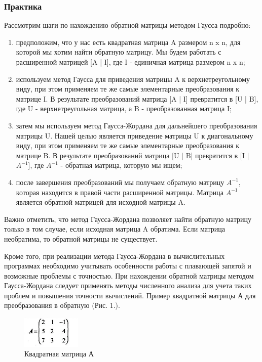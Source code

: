 \documentclass[12pt,a4paper]{scrartcl}
\begin{document}
\subsubsection{Практика}
Рассмотрим шаги по нахождению обратной матрицы методом Гаусса подробно:
\begin{enumerate}
        \item предположим, что у нас есть квадратная матрица A размером n x n, для которой мы хотим найти обратную матрицу. Мы будем работать с расширенной матрицей [A | I], где I - единичная матрица размером n x n;
        \item используем метод Гаусса для приведения матрицы A к верхнетреугольному виду, при этом применяем те же самые элементарные преобразования к матрице I. В результате преобразований матрица [A | I] превратится в [U | B], где U - верхнетреугольная матрица, а B - преобразованная матрица I;
        \item  затем мы используем метод Гаусса-Жордана для дальнейшего преобразования матрицы U. Нашей целью является приведение матрицы U к диагональному виду, при этом применяем те же самые элементарные преобразования к матрице B. В результате преобразований матрица [U | B] превратится в [I | $A^{-1}$], где $A^{-1}$ - обратная матрица, которую мы ищем;
        \item после завершения преобразований мы получаем обратную матрицу $A^{-1}$, которая находится в правой части расширенной матрицы. Матрица $A^{-1}$ является обратной матрицей для исходной матрицы A.
    \end{enumerate}
    \noindent 

Важно отметить, что метод Гаусса-Жордана позволяет найти обратную матрицу только в том случае, если исходная матрица A обратима. Если матрица необратима, то обратной матрицы не существует.

Кроме того, при реализации метода Гаусса-Жордана в вычислительных программах необходимо учитывать особенности работы с плавающей запятой и возможные проблемы с точностью. При нахождении обратной матрицы методом Гаусса-Жордана следует применять методы численного анализа для учета таких проблем и повышения точности вычислений. Пример квадратной матрицы А для преобразования в обратную (Рис. 1.).


\label{sec:picexample}
\begin{figure}[h]
 \centering
 \includegraphics[width=0.25\textwidth]{1.PNG}
  \caption{Квадратная матрица А}\label{fig:par}
\end{figure}
\end{document}
